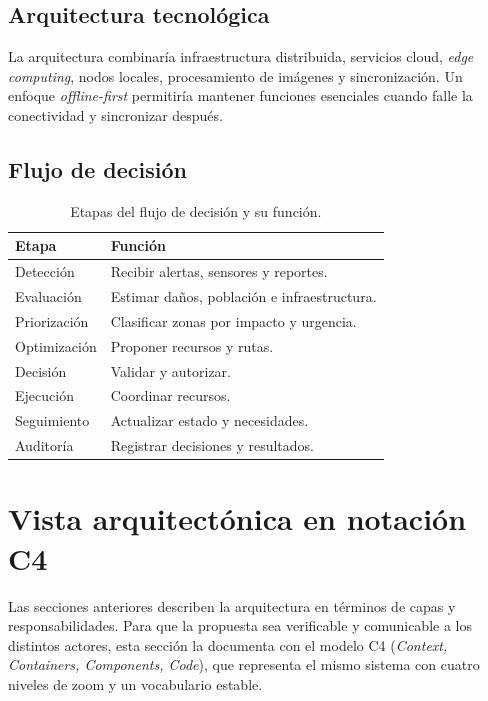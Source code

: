 \documentclass[11pt,a4paper]{article}
\begin{document}
\subsection{Arquitectura tecnológica}

La arquitectura combinaría infraestructura distribuida, servicios cloud,
\emph{edge computing}, nodos locales, procesamiento de imágenes y
sincronización. Un enfoque \emph{offline-first} permitiría mantener funciones
esenciales cuando falle la conectividad y sincronizar después.

\subsection{Flujo de decisión}

\begin{table}[htbp]
\centering
\caption{Etapas del flujo de decisión y su función.}
\label{tab:flujo}
\begin{tabularx}{0.9\textwidth}{@{}p{3.4cm}L@{}}
\toprule
\textbf{Etapa} & \textbf{Función} \\
\midrule
Detección     & Recibir alertas, sensores y reportes. \\
Evaluación    & Estimar daños, población e infraestructura. \\
Priorización  & Clasificar zonas por impacto y urgencia. \\
Optimización  & Proponer recursos y rutas. \\
Decisión      & Validar y autorizar. \\
Ejecución     & Coordinar recursos. \\
Seguimiento   & Actualizar estado y necesidades. \\
Auditoría     & Registrar decisiones y resultados. \\
\bottomrule
\end{tabularx}
\end{table}

\section{Vista arquitectónica en notación C4}

Las secciones anteriores describen la arquitectura en términos de capas y
responsabilidades. Para que la propuesta sea verificable y comunicable a los
distintos actores, esta sección la documenta con el modelo C4 (\emph{Context,
Containers, Components, Code}), que representa el mismo sistema con cuatro
niveles de zoom y un vocabulario estable.
\end{document}
